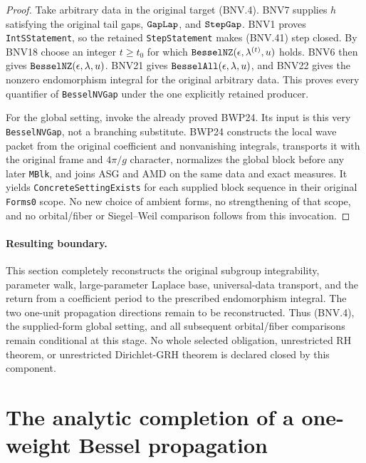 \documentclass[11pt,a4paper]{article}
\numberwithin{equation}{section}
\theoremstyle{remark}\newtheorem{remark}[theorem]{Remark}
\begin{document}
\begin{proof}
Take arbitrary data in the original target (BNV.4).  BNV7 supplies
$h$ satisfying the original tail gaps, $\texttt{Gap\allowbreak Lap}$, and
$\texttt{Step\allowbreak Gap}$.  BNV1 proves \texttt{Int\allowbreak SStatement}, so the retained
\texttt{Step\allowbreak Statement} makes (BNV.41) step closed.  By BNV18 choose
an integer $t\ge t_0$ for which
$\texttt{Bessel\allowbreak NZ}(\epsilon,\lambda^{(t)},u)$ holds.
BNV6 then gives $\texttt{Bessel\allowbreak NZ}(\epsilon,\lambda,u)$.
BNV21 gives $\texttt{Bessel\allowbreak All}(\epsilon,\lambda,u)$, and BNV22 gives
the nonzero endomorphism integral for the original arbitrary data.
This proves every quantifier of \texttt{Bessel\allowbreak NVGap} under the one
explicitly retained producer.

For the global setting, invoke the already proved BWP24.  Its input is
this very \texttt{Bessel\allowbreak NVGap}, not a branching substitute.  BWP24
constructs the local wave packet from the original coefficient and
nonvanishing integrals, transports it with the original frame and
$4\pi/g$ character, normalizes the global block before any later
\texttt{MBlk}, and joins ASG and AMD on the same data and exact measures.
It yields \texttt{Concrete\allowbreak Setting\allowbreak Exists} for each supplied block sequence
in their original \texttt{Forms0} scope.  No new choice of ambient forms,
no strengthening of that scope, and no orbital/fiber or Siegel--Weil
comparison follows from this invocation.
\end{proof}

\paragraph{Resulting boundary.}
This section completely reconstructs the original subgroup integrability,
parameter walk, large-parameter Laplace base, universal-data transport,
and the return from a coefficient period to the prescribed endomorphism
integral.  The two one-unit propagation directions remain to be
reconstructed.  Thus (BNV.4), the supplied-form global setting, and all
subsequent orbital/fiber comparisons remain conditional at this stage.
No whole selected obligation, unrestricted RH theorem, or unrestricted
Dirichlet-GRH theorem is declared closed by this component.


\section{The analytic completion of a one-weight Bessel propagation}
\label{sec:bessel-weight-propagation-v50}
\end{document}
